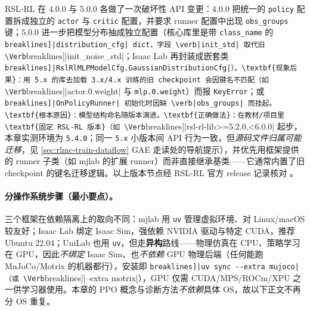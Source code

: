 \begin{pitfall}
RSL-RL 在 4.0.0 与 5.0.0 各做了一次破坏性 API 变更：4.0.0 把统一的 \verb|policy| 配置拆成独立的 \verb|actor| 与 \verb|critic| 配置，并要求 runner 配置中出现 \verb|obs_groups| 键；5.0.0 进一步把模型分布抽成独立配置（核心库里是带 \verb|class_name| 的 \Verb[breaklines]|distribution_cfg| dict，字段 \verb|init_std| 取代旧 \Verb[breaklines]|init_noise_std|；Isaac Lab 再封装成嵌套类 \Verb[breaklines]|RslRlMLPModelCfg.GaussianDistributionCfg|）。\textbf{现象后果}：用 5.x 的库去加载 3.x/4.x 训练的旧 checkpoint 会因键名不匹配（如 \Verb[breaklines]|actor.0.weight| 与 \verb|mlp.0.weight|）而报 \verb|KeyError|；或 \Verb[breaklines]|OnPolicyRunner| 初始化时因缺 \verb|obs_groups| 而挂起。\textbf{根本原因}：模型结构命名随版本演进。\textbf{正确做法}：在教材/项目里\textbf{固定 RSL-RL 版本}（如 \Verb[breaklines]|rsl-rl-lib>=5.2.0,<6.0.0| 起步，本章实测环境为 \verb|5.4.0|；同一 \verb|5.x| 小版本间 API 行为一致，但\emph{源码文件归属可能迁移}，见 \cref{sec:rlmc-train-dataflow} GAE 走读处的导航提示），并优先用框架提供的 runner 子类（如 mjlab 的扩展 runner）而非直接继承基类——它通常内置了旧 checkpoint 的键名迁移逻辑。以上版本节点经 RSL-RL 官方 release 记录核对 \cite{schwarke2025rslrl}。
\end{pitfall}

\paragraph{分操作系统步骤（最小要点）。}三个框架在依赖隔离上的取向不同：mjlab 用 \verb|uv| 管理虚拟环境、对 Linux/macOS 较友好；Isaac Lab 绑定 Isaac Sim，强依赖 NVIDIA 驱动与特定 CUDA，推荐 Ubuntu 22.04；UniLab 也用 \verb|uv|，但走\textbf{异构}路线——物理仿真在 CPU、策略学习在 GPU，因此\emph{不绑定} Isaac Sim、也\emph{不依赖} GPU 物理后端（任何能跑 MuJoCo/Motrix 的机器都行），安装即 \Verb[breaklines]|uv sync --extra mujoco|（或 \Verb[breaklines]|--extra motrix|），GPU 仅需 CUDA/MPS/ROCm/XPU 之一供学习器使用。本章的 PPO 概念与诊断方法\emph{不依赖}具体 OS，故以下正文不再分 OS 重复。

